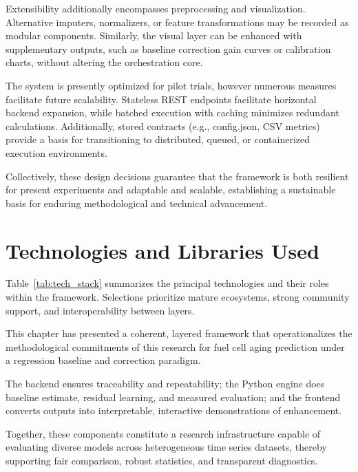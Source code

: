  Extensibility additionally encompasses preprocessing and visualization.  Alternative imputers, normalizers, or feature transformations may be recorded as modular components.  Similarly, the visual layer can be enhanced with supplementary outputs, such as baseline correction gain curves or calibration charts, without altering the orchestration core.  

 The system is presently optimized for pilot  trials, however numerous measures facilitate future scalability.  Stateless REST endpoints facilitate horizontal backend expansion, while batched execution with caching minimizes redundant calculations. Additionally, stored contracts (e.g., config.json, CSV metrics) provide a basis for transitioning to distributed, queued, or containerized execution environments.  

 Collectively, these design decisions guarantee that the framework is both resilient for present experiments and adaptable and scalable, establishing a sustainable basis for enduring methodological and technical advancement.
\section{Technologies and Libraries Used}
Table~\ref{tab:tech_stack} summarizes the principal technologies and their roles within the framework.  
Selections prioritize mature ecosystems, strong community support, and interoperability between layers.

This chapter has presented a coherent, layered framework that operationalizes the methodological commitments of this research  for fuel cell aging prediction under a regression baseline and correction paradigm.  

The backend ensures traceability and repeatability; the Python engine does baseline estimate, residual learning, and measured evaluation; and the frontend converts outputs into interpretable, interactive demonstrations of enhancement.

Together, these components constitute a research infrastructure capable of evaluating diverse models across heterogeneous time series datasets, thereby supporting fair comparison, robust statistics, and transparent diagnostics. 

